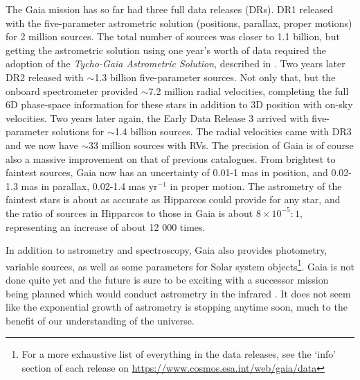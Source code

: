 The Gaia mission has so far had three full data releases (DRs). DR1 \citep{dr1} released with the five-parameter astrometric solution (positions, parallax, proper motions) for 2 million sources. The total number of sources was closer to 1.1 billion, but getting the astrometric solution using one year's worth of data required the adoption of the \textit{Tycho-Gaia Astrometric Solution}, described in \cite{michalik:15}. Two years later DR2 \citep{dr2} released with {$\sim$}1.3 billion five-parameter sources. Not only that, but the onboard spectrometer provided {$\sim$}7.2 million radial velocities, completing the full 6D phase-space information for these stars in addition to 3D position with on-sky velocities. Two years later again, the Early Data Release 3 \citep{edr3} arrived with five-parameter solutions for {$\sim$}1.4 billion sources. The radial velocities came with DR3 \citep{dr3} and we now have {$\sim$}33 million sources with RVs. The precision of Gaia is of course also a massive improvement on that of previous catalogues. From brightest to faintest sources, Gaia now has an uncertainty of 0.01-1 mas in position, and 0.02-1.3 mas in parallax, 0.02-1.4 mas yr$^{-1}$ in proper motion. The astrometry of the faintest stars is about as accurate as Hipparcos could provide for any star, and the ratio of sources in Hipparcos to those in Gaia is about $8\times 10^{-5}:1$, representing an increase of about 12 000 times. 

In addition to astrometry and spectroscopy, Gaia also provides photometry, variable sources, as well as some parameters for Solar system objects\footnote{For a more exhaustive list of everything in the data releases, see the `info' section of each release on \url{https://www.cosmos.esa.int/web/gaia/data}}. Gaia is not done quite yet and the future is sure to be exciting with a successor mission being planned which would conduct astrometry in the infrared \citep{hobbs:21}. It does not seem like the exponential growth of astrometry is stopping anytime soon, much to the benefit of our understanding of the universe.

